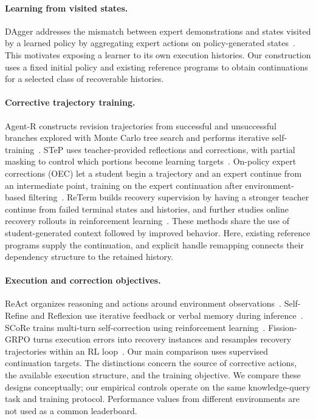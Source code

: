 \paragraph{Learning from visited states.}
DAgger addresses the mismatch between expert demonstrations and states visited by a learned policy by aggregating expert actions on policy-generated states~\cite{ross2011dagger}. This motivates exposing a learner to its own execution histories. Our construction uses a fixed initial policy and existing reference programs to obtain continuations for a selected class of recoverable histories.

\paragraph{Corrective trajectory training.}
Agent-R constructs revision trajectories from successful and unsuccessful branches explored with Monte Carlo tree search and performs iterative self-training~\cite{yuan2025agentr}. STeP uses teacher-provided reflections and corrections, with partial masking to control which portions become learning targets~\cite{chen2025step}. On-policy expert corrections (OEC) let a student begin a trajectory and an expert continue from an intermediate point, training on the expert continuation after environment-based filtering~\cite{lauffer2025oec}. ReTerm builds recovery supervision by having a stronger teacher continue from failed terminal states and histories, and further studies online recovery rollouts in reinforcement learning~\cite{xie2026reterm}. These methods share the use of student-generated context followed by improved behavior. Here, existing reference programs supply the continuation, and explicit handle remapping connects their dependency structure to the retained history.

\paragraph{Execution and correction objectives.}
ReAct organizes reasoning and actions around environment observations~\cite{yao2023react}. Self-Refine and Reflexion use iterative feedback or verbal memory during inference~\cite{madaan2023selfrefine,shinn2023reflexion}. SCoRe trains multi-turn self-correction using reinforcement learning~\cite{kumar2025score}. Fission-GRPO turns execution errors into recovery instances and resamples recovery trajectories within an RL loop~\cite{zhang2026fission}. Our main comparison uses supervised continuation targets. The distinctions concern the source of corrective actions, the available execution structure, and the training objective. We compare these designs conceptually; our empirical controls operate on the same knowledge-query task and training protocol. Performance values from different environments are not used as a common leaderboard.


